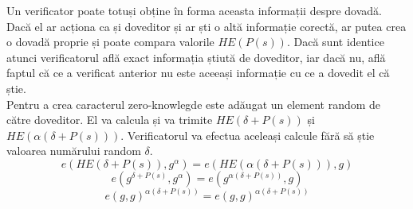\clearpage

Un verificator poate totuși obține în forma aceasta informații despre dovadă. Dacă el ar acționa ca și doveditor și ar ști o altă informație corectă, ar putea crea o dovadă proprie și poate compara valorile $HE(P(s))$. Dacă sunt identice atunci verificatorul află exact informația știută de doveditor, iar dacă nu, află faptul că ce a verificat anterior nu este aceeași informație cu ce a dovedit el că știe.\\

Pentru a crea caracterul zero-knowlegde este adăugat un element random de către doveditor. El va calcula și va trimite
$HE(\delta + P(s))$ și $HE(\alpha(\delta + P(s)))$. Verificatorul va efectua aceleași calcule fără să știe valoarea numărului random $\delta$.
\[ e(HE(\delta + P(s)), g^{\alpha}) = e(HE(\alpha(\delta + P(s))), g) \]
\[ e(g^{\delta + P(s)}, g^{\alpha}) = e(g^{\alpha(\delta + P(s))}, g) \]
\[ e(g,g)^{\alpha(\delta + P(s))} = e(g,g)^{\alpha(\delta + P(s))} \]